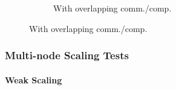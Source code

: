 \begin{frame}
\begin{figure}
\begin{subfigure}{0.47\textwidth}
      \caption{With overlapping comm./comp.}
      \label{FIG:Benchmark:Hybrid_1_Multi_Node}
    \end{subfigure}
    \label{FIG:Benchmark:Hybrid_Multi_Node}
  \end{figure}
\end{frame}


\begin{frame}
  \frametitle{Multi-node Scaling Tests}
  \framesubtitle{Weak Scaling}


\end{frame}
